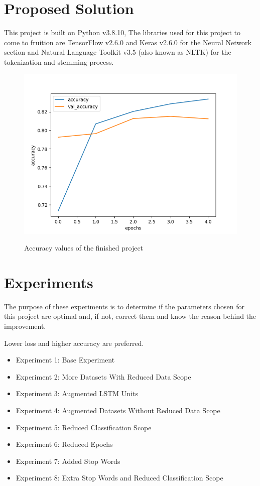 \documentclass[a4]{sciposter}
\begin{document}
\begin{multicols}{3}
\section{Proposed Solution}
This project is built on Python v3.8.10, The libraries used for this project to come to fruition are TensorFlow v2.6.0 and Keras v2.6.0 for the Neural Network section and Natural Language Toolkit v3.5 (also known as NLTK) for the tokenization and stemming process.
\begin{figure}[!h]
	\centering
	\includegraphics[scale=1]{Accuracy_Exp9}
	\label{fig:AccExp9}
	\captionsetup{type=figure}
	\setcounter{figure}{1}
	\caption{Accuracy values of the finished project}
\end{figure}


\section{Experiments}

The purpose of these experiments is to determine if the parameters chosen for this project are optimal and, if not, correct them and know the reason behind the improvement.
	
Lower loss and higher accuracy are preferred.

\begin{itemize}
\item Experiment 1: Base Experiment
\item Experiment 2: More Datasets With Reduced Data Scope
\item Experiment 3: Augmented LSTM Units
\item Experiment 4: Augmented Datasets Without Reduced Data Scope
\item Experiment 5: Reduced Classification Scope
\item Experiment 6: Reduced Epochs
\item Experiment 7: Added Stop Words
\item Experiment 8: Extra Stop Words and Reduced Classification Scope
\end{itemize}


\end{multicols}
\end{document}
